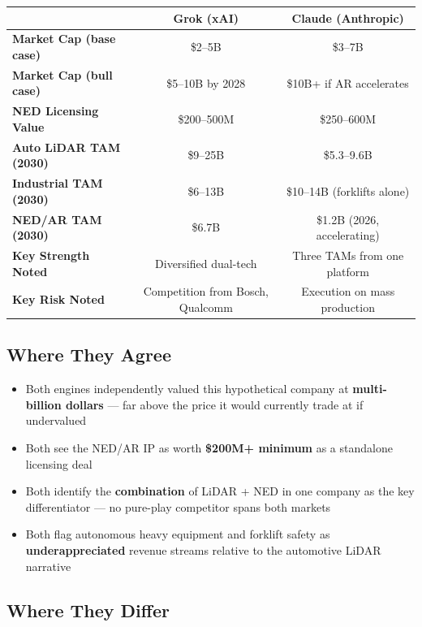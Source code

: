 \documentclass[11pt,letterpaper]{article}
\begin{document}
\begin{center}
\begin{tabular}{@{}lcc@{}}
\toprule
& {\color{grokred}\textbf{Grok (xAI)}} & {\color{claudeblue}\textbf{Claude (Anthropic)}} \\
\midrule
\textbf{Market Cap (base case)} & \$2--5B & \$3--7B \\
\textbf{Market Cap (bull case)} & \$5--10B by 2028 & \$10B+ if AR accelerates \\
\textbf{NED Licensing Value} & \$200--500M & \$250--600M \\
\textbf{Auto LiDAR TAM (2030)} & \$9--25B & \$5.3--9.6B \\
\textbf{Industrial TAM (2030)} & \$6--13B & \$10--14B (forklifts alone) \\
\textbf{NED/AR TAM (2030)} & \$6.7B & \$1.2B (2026, accelerating) \\
\textbf{Key Strength Noted} & Diversified dual-tech & Three TAMs from one platform \\
\textbf{Key Risk Noted} & Competition from Bosch, Qualcomm & Execution on mass production \\
\bottomrule
\end{tabular}
\end{center}

\subsection{Where They Agree}

\begin{itemize}
\item Both engines independently valued this hypothetical company at \textbf{multi-billion dollars} --- far above the price it would currently trade at if undervalued
\item Both see the NED/AR IP as worth \textbf{\$200M+ minimum} as a standalone licensing deal
\item Both identify the \textbf{combination} of LiDAR + NED in one company as the key differentiator --- no pure-play competitor spans both markets
\item Both flag autonomous heavy equipment and forklift safety as \textbf{underappreciated} revenue streams relative to the automotive LiDAR narrative
\end{itemize}

\subsection{Where They Differ}
\end{document}
